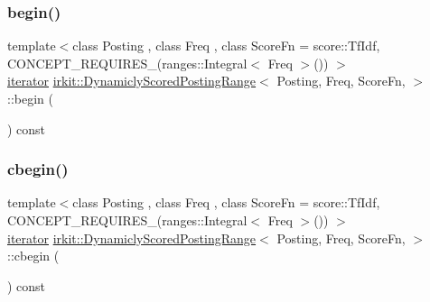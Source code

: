 \subsubsection{\texorpdfstring{begin()}{begin()}}
{\footnotesize\ttfamily template$<$class Posting , class Freq , class Score\+Fn  = score\+::\+Tf\+Idf, C\+O\+N\+C\+E\+P\+T\+\_\+\+R\+E\+Q\+U\+I\+R\+E\+S\+\_\+(ranges\+::\+Integral$<$ Freq $>$()) $>$ \\
\mbox{\hyperlink{classirkit_1_1DynamiclyScoredPostingRange_1_1iterator}{iterator}} \mbox{\hyperlink{classirkit_1_1DynamiclyScoredPostingRange}{irkit\+::\+Dynamicly\+Scored\+Posting\+Range}}$<$ Posting, Freq, Score\+Fn, $>$\+::begin (\begin{DoxyParamCaption}{ }\end{DoxyParamCaption}) const\hspace{0.3cm}{\ttfamily [inline]}}

\mbox{\label{classirkit_1_1DynamiclyScoredPostingRange_a9fe9532cee4feaeefe305e8593f436b6}} 
\subsubsection{\texorpdfstring{cbegin()}{cbegin()}}
{\footnotesize\ttfamily template$<$class Posting , class Freq , class Score\+Fn  = score\+::\+Tf\+Idf, C\+O\+N\+C\+E\+P\+T\+\_\+\+R\+E\+Q\+U\+I\+R\+E\+S\+\_\+(ranges\+::\+Integral$<$ Freq $>$()) $>$ \\
\mbox{\hyperlink{classirkit_1_1DynamiclyScoredPostingRange_1_1iterator}{iterator}} \mbox{\hyperlink{classirkit_1_1DynamiclyScoredPostingRange}{irkit\+::\+Dynamicly\+Scored\+Posting\+Range}}$<$ Posting, Freq, Score\+Fn, $>$\+::cbegin (\begin{DoxyParamCaption}{ }\end{DoxyParamCaption}) const\hspace{0.3cm}{\ttfamily [inline]}}

\mbox{\label{classirkit_1_1DynamiclyScoredPostingRange_a85219c57f0da94d00d1ed1c8f041d976}} 
